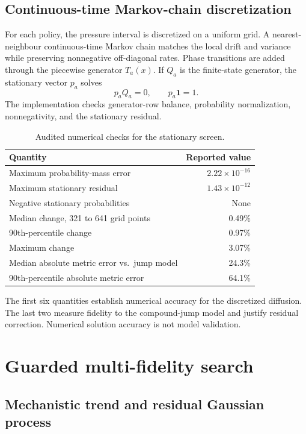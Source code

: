 \documentclass[futureinternet,supfile,submit,moreauthors]{Definitions/mdpi}
\begin{document}
\subsection{Continuous-time Markov-chain discretization}

For each policy, the pressure interval is discretized on a uniform grid. A
nearest-neighbour continuous-time Markov chain matches the local drift and
variance while preserving nonnegative off-diagonal rates. Phase transitions
are added through the piecewise generator \(T_a(x)\). If \(Q_a\) is the
finite-state generator, the stationary vector \(p_a\) solves
\[
p_aQ_a=0,
\qquad
p_a\mathbf 1=1.
\]
The implementation checks generator-row balance, probability normalization,
nonnegativity, and the stationary residual.

\begin{table}[h]
\centering
\small
\caption{Audited numerical checks for the stationary screen.}
\label{tab:numerical-checks}
\begin{tabular}{lr}
\toprule
Quantity & Reported value\\
\midrule
Maximum probability-mass error & \(2.22\times10^{-16}\)\\
Maximum stationary residual & \(1.43\times10^{-12}\)\\
Negative stationary probabilities & None\\
Median change, 321 to 641 grid points & 0.49\%\\
90th-percentile change & 0.97\%\\
Maximum change & 3.07\%\\
Median absolute metric error vs.\ jump model & 24.3\%\\
90th-percentile absolute metric error & 64.1\%\\
\bottomrule
\end{tabular}
\end{table}

The first six quantities establish numerical accuracy for the discretized
diffusion. The last two measure fidelity to the compound-jump model and
justify residual correction. Numerical solution accuracy is not model
validation.

\section{Guarded multi-fidelity search}
\label{sec:search}

\subsection{Mechanistic trend and residual Gaussian process}
\end{document}
